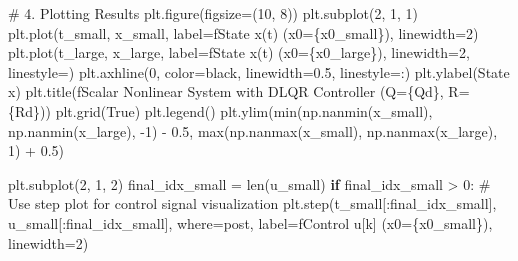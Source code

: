 \documentclass[
  letterpaper,
  DIV=11,
  numbers=noendperiod,
  oneside]{scrartcl}
\newenvironment{Shaded}{\begin{snugshade}}{\end{snugshade}}
\newcommand{\BuiltInTok}[1]{\textcolor[rgb]{0.00,0.23,0.31}{#1}}
\newcommand{\CommentTok}[1]{\textcolor[rgb]{0.37,0.37,0.37}{#1}}
\newcommand{\ControlFlowTok}[1]{\textcolor[rgb]{0.00,0.23,0.31}{\textbf{#1}}}
\newcommand{\DecValTok}[1]{\textcolor[rgb]{0.68,0.00,0.00}{#1}}
\newcommand{\FloatTok}[1]{\textcolor[rgb]{0.68,0.00,0.00}{#1}}
\newcommand{\NormalTok}[1]{\textcolor[rgb]{0.00,0.23,0.31}{#1}}
\newcommand{\OperatorTok}[1]{\textcolor[rgb]{0.37,0.37,0.37}{#1}}
\newcommand{\SpecialCharTok}[1]{\textcolor[rgb]{0.37,0.37,0.37}{#1}}
\newcommand{\SpecialStringTok}[1]{\textcolor[rgb]{0.13,0.47,0.30}{#1}}
\newcommand{\StringTok}[1]{\textcolor[rgb]{0.13,0.47,0.30}{#1}}
\newcommand{\VariableTok}[1]{\textcolor[rgb]{0.07,0.07,0.07}{#1}}
\begin{document}
\begin{Shaded}
\begin{Highlighting}[numbers=left,,]
\CommentTok{\# 4. Plotting Results}
\NormalTok{plt.figure(figsize}\OperatorTok{=}\NormalTok{(}\DecValTok{10}\NormalTok{, }\DecValTok{8}\NormalTok{))}
\NormalTok{plt.subplot(}\DecValTok{2}\NormalTok{, }\DecValTok{1}\NormalTok{, }\DecValTok{1}\NormalTok{)}
\NormalTok{plt.plot(t\_small, x\_small, label}\OperatorTok{=}\SpecialStringTok{f\textquotesingle{}State x(t) (x0=}\SpecialCharTok{\{}\NormalTok{x0\_small}\SpecialCharTok{\}}\SpecialStringTok{)\textquotesingle{}}\NormalTok{, linewidth}\OperatorTok{=}\DecValTok{2}\NormalTok{)}
\NormalTok{plt.plot(t\_large, x\_large, label}\OperatorTok{=}\SpecialStringTok{f\textquotesingle{}State x(t) (x0=}\SpecialCharTok{\{}\NormalTok{x0\_large}\SpecialCharTok{\}}\SpecialStringTok{)\textquotesingle{}}\NormalTok{, linewidth}\OperatorTok{=}\DecValTok{2}\NormalTok{, linestyle}\OperatorTok{=}\StringTok{\textquotesingle{}{-}{-}\textquotesingle{}}\NormalTok{)}
\NormalTok{plt.axhline(}\DecValTok{0}\NormalTok{, color}\OperatorTok{=}\StringTok{\textquotesingle{}black\textquotesingle{}}\NormalTok{, linewidth}\OperatorTok{=}\FloatTok{0.5}\NormalTok{, linestyle}\OperatorTok{=}\StringTok{\textquotesingle{}:\textquotesingle{}}\NormalTok{)}
\NormalTok{plt.ylabel(}\StringTok{\textquotesingle{}State x\textquotesingle{}}\NormalTok{)}
\NormalTok{plt.title(}\SpecialStringTok{f\textquotesingle{}Scalar Nonlinear System with DLQR Controller (Q=}\SpecialCharTok{\{}\NormalTok{Qd}\SpecialCharTok{\}}\SpecialStringTok{, R=}\SpecialCharTok{\{}\NormalTok{Rd}\SpecialCharTok{\}}\SpecialStringTok{)\textquotesingle{}}\NormalTok{)}
\NormalTok{plt.grid(}\VariableTok{True}\NormalTok{)}
\NormalTok{plt.legend()}
\NormalTok{plt.ylim(}\BuiltInTok{min}\NormalTok{(np.nanmin(x\_small), np.nanmin(x\_large), }\OperatorTok{{-}}\DecValTok{1}\NormalTok{) }\OperatorTok{{-}} \FloatTok{0.5}\NormalTok{, }\BuiltInTok{max}\NormalTok{(np.nanmax(x\_small), np.nanmax(x\_large), }\DecValTok{1}\NormalTok{) }\OperatorTok{+} \FloatTok{0.5}\NormalTok{)}

\NormalTok{plt.subplot(}\DecValTok{2}\NormalTok{, }\DecValTok{1}\NormalTok{, }\DecValTok{2}\NormalTok{)}
\NormalTok{final\_idx\_small }\OperatorTok{=} \BuiltInTok{len}\NormalTok{(u\_small)}
\ControlFlowTok{if}\NormalTok{ final\_idx\_small }\OperatorTok{\textgreater{}} \DecValTok{0}\NormalTok{:}
    \CommentTok{\# Use step plot for control signal visualization}
\NormalTok{    plt.step(t\_small[:final\_idx\_small], u\_small[:final\_idx\_small], where}\OperatorTok{=}\StringTok{\textquotesingle{}post\textquotesingle{}}\NormalTok{,}
\NormalTok{             label}\OperatorTok{=}\SpecialStringTok{f\textquotesingle{}Control u[k] (x0=}\SpecialCharTok{\{}\NormalTok{x0\_small}\SpecialCharTok{\}}\SpecialStringTok{)\textquotesingle{}}\NormalTok{, linewidth}\OperatorTok{=}\DecValTok{2}\NormalTok{)}


\end{Highlighting}
\end{Shaded}
\end{document}

